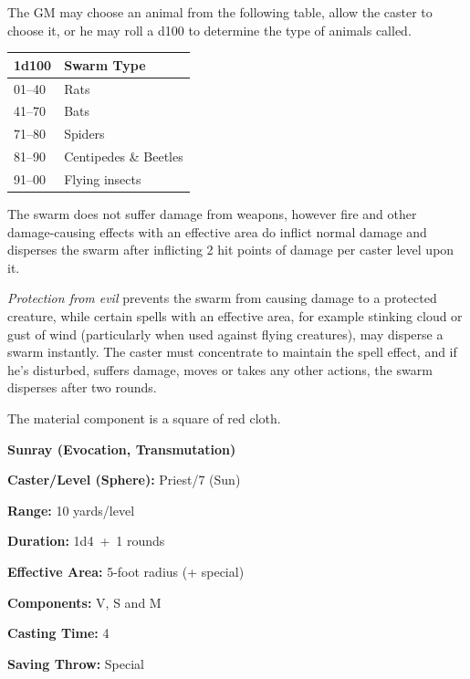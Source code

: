 \begin{multicols}{2}
The GM may choose an animal from the following table, allow the caster to choose it, or he may roll a d100 to determine the type of animals called.

\noindent
\begin{tabular}{|p{}|p{}|}
\hline
1d100	& Swarm Type \\
\hline\hline
\rowcolor[gray]{.9}01--40	& Rats \\
41--70	& Bats \\
\rowcolor[gray]{.9}71--80	& Spiders \\
81--90	& Centipedes \& Beetles \\
\rowcolor[gray]{.9}91--00	& Flying insects \\
\hline
\end{tabular}

The swarm does not suffer damage from weapons, however fire and other damage-causing effects with an effective area do inflict normal damage and disperses the swarm after inflicting 2 hit points of damage per caster level upon it.  

\textit{Protection from evil} prevents the swarm from causing damage to a protected creature, while certain spells with an effective area, for example stinking cloud or gust of wind (particularly when used against flying creatures), may disperse a swarm instantly.  The caster must concentrate to maintain the spell effect, and if he's disturbed, suffers damage, moves or takes any other actions, the swarm disperses after two rounds.

The material component is a square of red cloth.

\vspace{1em}

\noindent
\begin{minipage}{\columnwidth}

\noindent \textbf{Sunray (Evocation, Transmutation)}

\noindent \textbf{Caster/Level (Sphere):} Priest/7 (Sun)

\noindent \textbf{Range:} 10 yards/level

\noindent \textbf{Duration:} 1d4~+~1 rounds

\noindent \textbf{Effective Area:} 5-foot radius (+ special)

\noindent \textbf{Components:} V, S and M

\noindent \textbf{Casting Time:} 4

\noindent \textbf{Saving Throw:} Special


\end{minipage}
\end{multicols}
